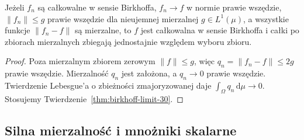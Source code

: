 \begin{wniosek}
\label{cor:birkhoff-dct-30}
Jeżeli $f_n$ są całkowalne w sensie Birkhoffa,
$f_n\to f$ w normie prawie wszędzie,
$\|f_n\|\le g$ prawie wszędzie dla nieujemnej
mierzalnej $g\in L^1(\mu)$, a wszystkie funkcje
$\|f_n-f\|$ są mierzalne, to $f$ jest całkowalna
w sensie Birkhoffa i całki po zbiorach mierzalnych
zbiegają jednostajnie względem wyboru zbioru.
\end{wniosek}
\begin{proof}
Poza mierzalnym zbiorem zerowym $\|f\|\le g$,
więc $q_n=\|f_n-f\|\le2g$ prawie wszędzie.
Mierzalność $q_n$ jest założona, a $q_n\to0$
prawie wszędzie. Twierdzenie Lebesgue'a
o zbieżności zmajoryzowanej daje
$\int_\Omega q_n\,\mathrm d\mu\to0$.
Stosujemy Twierdzenie~\ref{thm:birkhoff-limit-30}.
\end{proof}

\subsection{Silna mierzalność i mnożniki skalarne}


